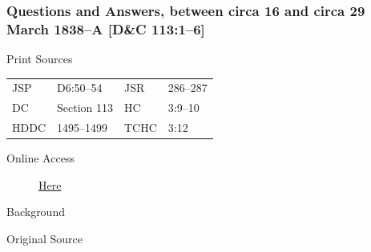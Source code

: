 		\subsubsection{Questions and Answers, between circa 16 and circa 29 March 1838--A [D\&C 113:1--6]}
			\label{EMS-1838-JS-CIR-16-CIR-29-MAR-1838-A}
			
			\begin{description}
					\item[Print Sources]
				\end{description}

					\begin{tabular}{p{0.5in}p{1in}p{0.5in}p{1in}}
					JSP	 	& D6:50--54				& JSR 		& 286--287 \\
					DC	 	& Section 113		& HC 		& 3:9--10 \\
					HDDC 	& 1495--1499		& TCHC 		& 3:12 \\
					\end{tabular}
				
				\begin{description}
					\item[Online Access] \href{https://www.josephsmithpapers.org/paper-summary/questions-and-answers-between-circa-16-and-circa-29-march-1838-a-dc-1131-6/1}{Here}
				\end{description}
				
				\begin{description}
					\item[Background]
				\end{description}
				
				
				\begin{description}
					\item[Original Source]
				\end{description}
				
				
